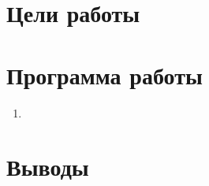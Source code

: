 





\tableofcontents
\newpage

\section{Цели работы}



\section{Программа работы}

\begin{enumerate}
	\item 
	
 
\end{enumerate}
 

%
%
% 
%
 

\section{Выводы}




